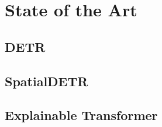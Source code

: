 \chapter{State of the Art}
\label{ch:sota}
\section{DETR}
\section{SpatialDETR}
\section{Explainable Transformer}
